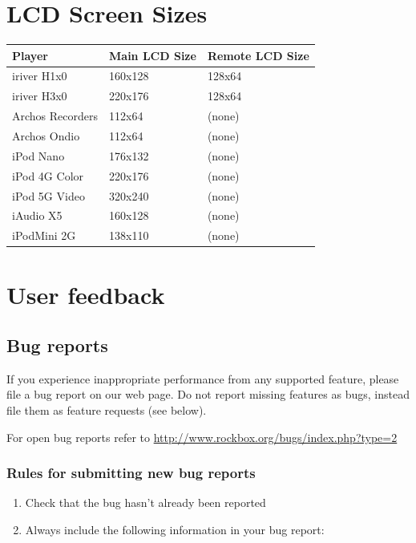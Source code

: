 \chapter{LCD Screen Sizes}
\begin{center}
  \begin{tabularx}{.8\textwidth}{lXX}\toprule
    \textbf{Player} & \textbf{Main LCD Size} & \textbf{Remote LCD Size}\\\midrule
    iriver H1x0 & 160x128 & 128x64\\
    iriver H3x0 & 220x176 & 128x64\\
    Archos Recorders & 112x64 & (none)\\ 
    Archos Ondio & 112x64 & (none)\\
    iPod Nano & 176x132 & (none)\\
    iPod 4G Color & 220x176 & (none)\\
    iPod 5G Video & 320x240 & (none)\\
    iAudio X5 & 160x128 & (none)\\
    iPodMini 2G &138x110 & (none) \\\bottomrule
  \end{tabularx}
\end{center}


\chapter{User feedback}
\section{Bug reports}
If you experience inappropriate performance from any supported feature,
please file a bug report on our web page. Do not report missing
features as bugs, instead file them as feature requests (see below).

For open bug reports refer to
\url{http://www.rockbox.org/bugs/index.php?type=2}

\subsection{Rules for submitting new bug reports}

\begin{enumerate}
\item  Check that the bug hasn't already been reported
\item  Always include the following information in your bug report:
\end{enumerate}

